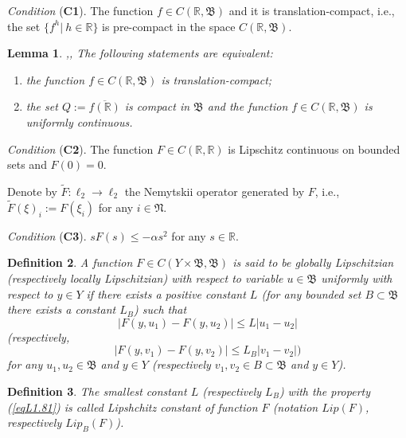 \documentclass{amsart}%
\newtheorem{lemma}{Lemma}[section]
\newtheorem{definition}[lemma]{Definition}
\begin{document}
\emph{Condition }(\textbf{C1}). \label{C1} The function $f\in
C(\mathbb R,\mathfrak B)$ and it is translation-compact, i.e., the
set $\{f^{h}|\ h\in \mathbb R\}$ is pre-compact in the space
$C(\mathbb R,\mathfrak B)$.

\begin{lemma}\label{l2.1} \cite[Ch.IV,p.236]{Bro79},\cite[Ch.III]{Sel_1971},\cite[Ch.IV]{sib} The following statements are equivalent:
\begin{enumerate}
\item the function $f\in C(\mathbb R,\mathfrak B)$ is
translation-compact; \item the set $Q:=\overline{f(\mathbb R)}$ is
compact in $\mathfrak B$ and the function $f\in C(\mathbb
R,\mathfrak B)$ is uniformly continuous.
\end{enumerate}
\end{lemma}

\emph{Condition} (\textbf{C2}). \label{C2} The function $F\in
C(\mathbb R,\mathbb R)$ is Lipschitz continuous on bounded sets
and $F(0)=0$.

Denote by $ \widetilde{F}:\ell_{2}\to \ell_{2}$ the Nemytskii
operator generated by $F$, i.e.,
$\widetilde{F}(\xi)_{i}:=F(\xi_{i})$ for any $i\in \mathfrak N$.

\emph{Condition} (\textbf{C3}). \label{C3} $sF(s)\leq -\alpha s^2$
for any $s\in \mathbb R$.

\begin{definition}\label{defL1.8} A function $F\in C(Y\times \mathfrak B,\mathfrak
B)$ is said to be globally Lipschitzian (respectively locally
Lipschitzian) with respect to variable $u\in \mathfrak B$
uniformly with respect to $y\in Y$ if there exists a positive
constant $L$ (for any bounded set $B \subset \mathfrak B$ there
exists a constant $L_{B}$) such that
\begin{equation}\label{eqL1.81}
|F(y,u_1)-F(y,u_2)|\le L |u_1-u_2| \nonumber
\end{equation}
(respectively,
\begin{equation}\label{eqL1.82}
|F(y,v_1)-F(y,v_2)|\le L_{B} |v_1-v_2|) \nonumber
\end{equation}
for any $u_1,u_2\in \mathfrak B$ and $y\in Y$ (respectively $v_1,
v_2 \in B \subset \mathfrak B$ and $y\in Y$).
\end{definition}

\begin{definition}\label{defL2.8}
The smallest constant $L$ (respectively $L_{B}$) with the property
(\ref{eqL1.81}) is called Lipshchitz constant of function $F$
(notation $Lip(F)$, respectively $Lip_{B}(F)$).
\end{definition}
\end{document}
